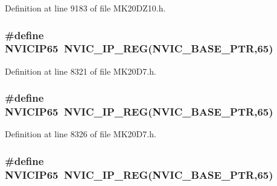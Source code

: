 Definition at line 9183 of file M\+K20\+D\+Z10.\+h.

\subsubsection[{\texorpdfstring{N\+V\+I\+C\+I\+P65}{NVICIP65}}]{\setlength{\rightskip}{0pt plus 5cm}\#define N\+V\+I\+C\+I\+P65~{\bf N\+V\+I\+C\+\_\+\+I\+P\+\_\+\+R\+EG}({\bf N\+V\+I\+C\+\_\+\+B\+A\+S\+E\+\_\+\+P\+TR},65)}\hypertarget{group___n_v_i_c___register___accessor___macros_ga32d795988379c533e514b20852c3ed27}{}\label{group___n_v_i_c___register___accessor___macros_ga32d795988379c533e514b20852c3ed27}


Definition at line 8321 of file M\+K20\+D7.\+h.

\subsubsection[{\texorpdfstring{N\+V\+I\+C\+I\+P65}{NVICIP65}}]{\setlength{\rightskip}{0pt plus 5cm}\#define N\+V\+I\+C\+I\+P65~{\bf N\+V\+I\+C\+\_\+\+I\+P\+\_\+\+R\+EG}({\bf N\+V\+I\+C\+\_\+\+B\+A\+S\+E\+\_\+\+P\+TR},65)}\hypertarget{group___n_v_i_c___register___accessor___macros_ga32d795988379c533e514b20852c3ed27}{}\label{group___n_v_i_c___register___accessor___macros_ga32d795988379c533e514b20852c3ed27}


Definition at line 8326 of file M\+K20\+D7.\+h.

\subsubsection[{\texorpdfstring{N\+V\+I\+C\+I\+P65}{NVICIP65}}]{\setlength{\rightskip}{0pt plus 5cm}\#define N\+V\+I\+C\+I\+P65~{\bf N\+V\+I\+C\+\_\+\+I\+P\+\_\+\+R\+EG}({\bf N\+V\+I\+C\+\_\+\+B\+A\+S\+E\+\_\+\+P\+TR},65)}\hypertarget{group___n_v_i_c___register___accessor___macros_ga32d795988379c533e514b20852c3ed27}{}\label{group___n_v_i_c___register___accessor___macros_ga32d795988379c533e514b20852c3ed27}



